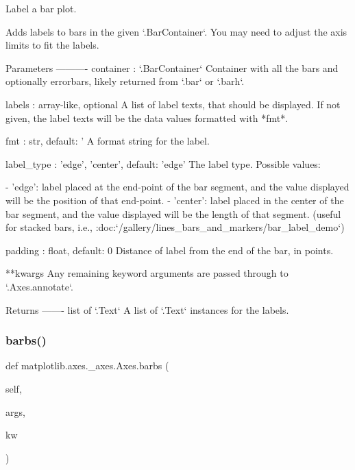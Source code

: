 \begin{DoxyVerb}Label a bar plot.

Adds labels to bars in the given `.BarContainer`.
You may need to adjust the axis limits to fit the labels.

Parameters
----------
container : `.BarContainer`
    Container with all the bars and optionally errorbars, likely
    returned from `.bar` or `.barh`.

labels : array-like, optional
    A list of label texts, that should be displayed. If not given, the
    label texts will be the data values formatted with *fmt*.

fmt : str, default: '%
    A format string for the label.

label_type : {'edge', 'center'}, default: 'edge'
    The label type. Possible values:

    - 'edge': label placed at the end-point of the bar segment, and the
      value displayed will be the position of that end-point.
    - 'center': label placed in the center of the bar segment, and the
      value displayed will be the length of that segment.
      (useful for stacked bars, i.e.,
      :doc:`/gallery/lines_bars_and_markers/bar_label_demo`)

padding : float, default: 0
    Distance of label from the end of the bar, in points.

**kwargs
    Any remaining keyword arguments are passed through to
    `.Axes.annotate`.

Returns
-------
list of `.Text`
    A list of `.Text` instances for the labels.
\end{DoxyVerb}
 \mbox{\label{classmatplotlib_1_1axes_1_1__axes_1_1Axes_a35f40a06eff616203d4a9baa3f452c28}} 
\subsubsection{\texorpdfstring{barbs()}{barbs()}}
{\footnotesize\ttfamily def matplotlib.\+axes.\+\_\+axes.\+Axes.\+barbs (\begin{DoxyParamCaption}\item[{}]{self,  }\item[{}]{args,  }\item[{}]{kw }\end{DoxyParamCaption})}

